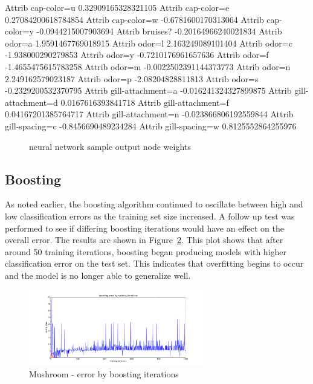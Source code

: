 \documentclass{sig-alternate}
\begin{document}
\small
\begin{verbbox}
Attrib cap-color=u    0.32909165328321105
Attrib cap-color=e    0.27084200618784854
Attrib cap-color=w    -0.6781600170313064
Attrib cap-color=y    -0.0944215007903694
Attrib bruises?    -0.20164966240021834
Attrib odor=a    1.9591467769018915
Attrib odor=l    2.163249089101404
Attrib odor=c    -1.938000290279853
Attrib odor=y    -0.7210176961657636
Attrib odor=f    -1.4655475615783258
Attrib odor=m    -0.0022502391144373773
Attrib odor=n    2.249162579023187
Attrib odor=p    -2.08204828811813
Attrib odor=s    -0.2329200532370795
Attrib gill-attachment=a    -0.016241324327899875
Attrib gill-attachment=d    0.0167616393841718
Attrib gill-attachment=f    0.04167201385764717
Attrib gill-attachment=n    -0.023866806192559844
Attrib gill-spacing=c    -0.8456690489234284
Attrib gill-spacing=w    0.8125552864255976
\end{verbbox}
\normalsize

\begin{figure}[!htbp]
    \centering
    \theverbbox
    \caption{neural network sample output node weights \label{ag-nn-weights}}
\end{figure}


\subsection{Boosting}

As noted earlier, the boosting algorithm continued to oscillate between high and low classification errors as the training set size increased. A follow up test was performed to see if differing boosting iterations would have an effect on the overall error. The results are shown in Figure~\ref{ag-boost-iter}. This plot shows that after around 50 training iterations, boosting began producing models with higher classification error on the test set. This indicates that overfitting begins to occur and the model is no longer able to generalize well.

\begin{figure}[!htbp]
    \centering
    \includegraphics[width=3in]{data/agaricus-lepiota/boosting/training-iterations.pdf}
    \caption{Mushroom - error by boosting iterations \label{ag-boost-iter}}
\end{figure} 
\end{document}
